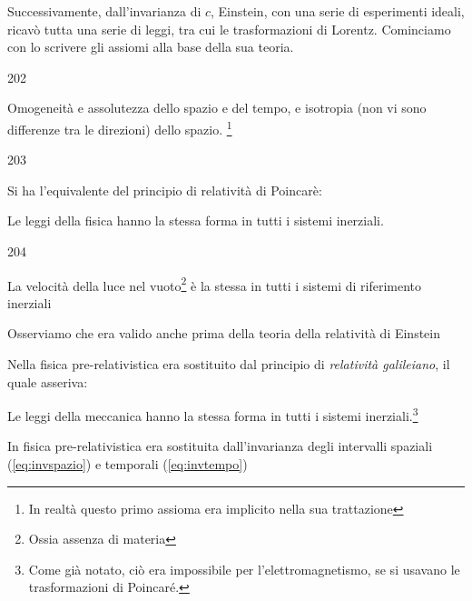 Successivamente, dall'invarianza di $c$, Einstein, con una serie di
esperimenti ideali, ricav\`o tutta una serie di leggi, tra cui le
trasformazioni di Lorentz. Cominciamo con lo scrivere gli assiomi alla
base della sua teoria.
\begin{dinglist}{202}
\item Omogeneit\`a e assolutezza dello spazio e del tempo, e isotropia
  (non vi sono differenze tra le direzioni) dello spazio. \footnote{In
    realt\`a questo primo assioma era implicito nella sua trattazione}
\end{dinglist}
\begin{dinglist}{203}
\item Si ha l'equivalente del principio di relativit\`a di Poincar\`e:
  \begin{principio} Le leggi della
    fisica hanno la stessa forma in tutti i sistemi inerziali.
  \end{principio}
\end{dinglist}
\begin{dinglist}{204}
\item La velocit\`a della luce nel vuoto\footnote{Ossia assenza di
    materia} \`e la stessa in tutti i sistemi di riferimento inerziali
\end{dinglist}
\begin{osservazione}
  Osserviamo che  era valido anche prima della teoria della
  relativit\`a di Einstein
\end{osservazione}
\begin{osservazione}
  Nella fisica pre-relativistica  era sostituito dal
  principio di \emph{relativit\`a galileiano}, il quale asseriva:
\end{osservazione}
\begin{principio} Le leggi della meccanica hanno la stessa
  forma in tutti i sistemi inerziali.\footnote{Come gi\`a notato,
    ci\`o era impossibile per l'elettromagnetismo, se si usavano le
    trasformazioni di Poincar\'e.}
\end{principio}
\begin{osservazione}
  In fisica pre-relativistica  era sostituita
  dall'invarianza degli intervalli spaziali (\ref{eq:invspazio}) e
  temporali (\ref{eq:invtempo})
\end{osservazione}
